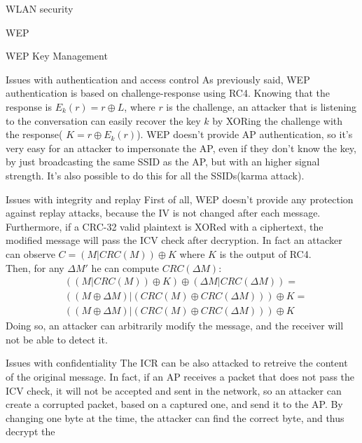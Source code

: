 \begin{section}{WLAN security}
\begin{subsection}{WEP}
\begin{subsubsection}{WEP Key Management}
    \end{subsubsection}
    \begin{subsubsection}{Issues with authentication and access control}
      As previously said, WEP authentication is based on challenge-response using RC4. Knowing that
      the response is $E_k(r)=r\oplus L$, where $r$ is the challenge, an attacker that is listening 
      to the conversation can easily recover the key $k$ by XORing the challenge with the response(
      $K=r\oplus E_k(r)$). WEP doesn't provide AP authentication, so it's very easy for an attacker
      to impersonate the AP, even if they don't know the key, by just broadcasting the same SSID as the
      AP, but with an higher signal strength. It's also possible to do this for all the SSIDs(karma attack).
    \end{subsubsection}
    \begin{subsubsection}{Issues with integrity and replay}
      First of all, WEP doesn't provide any protection against replay attacks, because the IV is
      not changed after each message.\\
      Furthermore, if a CRC-32 valid plaintext is XORed with a ciphertext, the modified message 
      will pass the ICV check after decryption. In fact an attacker can observe $C=(M|CRC(M))\oplus K$
      where $K$ is the output of RC4.\\ 
      Then, for any $\Delta M'$ he can compute $CRC(\Delta M)$:
      \begin{equation}
        \begin{split}
        &((M|CRC(M))\oplus K)\oplus (\Delta M|CRC(\Delta M)) =\\
        &((M\oplus \Delta M)|(CRC(M)\oplus CRC(\Delta M)))\oplus K=\\
        &((M\oplus \Delta M)|(CRC(M)\oplus CRC(\Delta M)))\oplus K
        \end{split}
      \end{equation}
      Doing so, an attacker can arbitrarily modify the message, and the receiver will not be able to
      detect it.
    \end{subsubsection}
    \begin{subsubsection}{Issues with confidentiality}
      The ICR can be also attacked to retreive the content of the original message. In fact, if an
      AP receives a packet that does not pass the ICV check, it will not be accepted and sent in the network,
      so an attacker can create a corrupted packet, based on a captured one, and send it to the AP.
      By changing one byte at the time, the attacker can find the correct byte, and thus decrypt the

\end{subsubsection}
\end{subsection}
\end{section}
